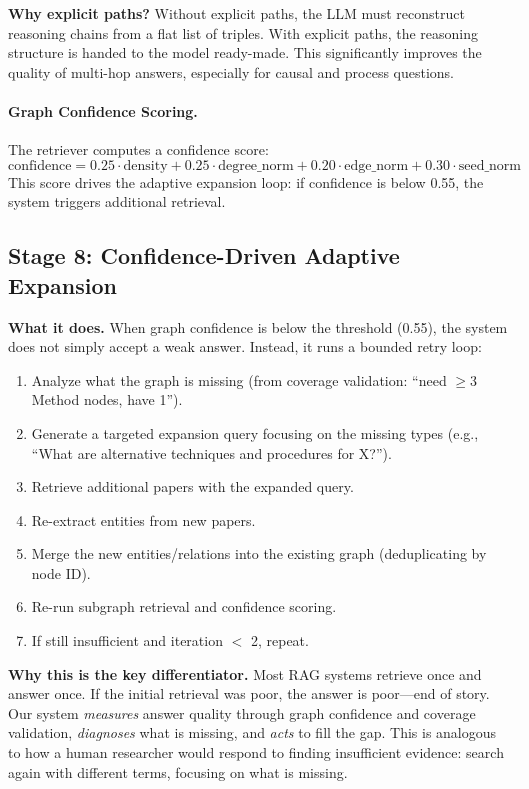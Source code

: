 \documentclass[11pt]{article}
\begin{document}
\textbf{Why explicit paths?} Without explicit paths, the LLM must reconstruct reasoning chains from a flat list of triples. With explicit paths, the reasoning structure is handed to the model ready-made. This significantly improves the quality of multi-hop answers, especially for causal and process questions.

\paragraph{Graph Confidence Scoring.} The retriever computes a confidence score:
\[
\text{confidence} = 0.25 \cdot \text{density} + 0.25 \cdot \text{degree\_norm} + 0.20 \cdot \text{edge\_norm} + 0.30 \cdot \text{seed\_norm}
\]
This score drives the adaptive expansion loop: if confidence is below 0.55, the system triggers additional retrieval.

\subsection{Stage 8: Confidence-Driven Adaptive Expansion}

\textbf{What it does.} When graph confidence is below the threshold (0.55), the system does not simply accept a weak answer. Instead, it runs a bounded retry loop:

\begin{enumerate}[leftmargin=1.2em]
  \item Analyze what the graph is missing (from coverage validation: ``need $\geq$3 Method nodes, have 1'').
  \item Generate a targeted expansion query focusing on the missing types (e.g., ``What are alternative techniques and procedures for X?'').
  \item Retrieve additional papers with the expanded query.
  \item Re-extract entities from new papers.
  \item Merge the new entities/relations into the existing graph (deduplicating by node ID).
  \item Re-run subgraph retrieval and confidence scoring.
  \item If still insufficient and iteration $<$ 2, repeat.
\end{enumerate}

\textbf{Why this is the key differentiator.} Most RAG systems retrieve once and answer once. If the initial retrieval was poor, the answer is poor---end of story. Our system \emph{measures} answer quality through graph confidence and coverage validation, \emph{diagnoses} what is missing, and \emph{acts} to fill the gap. This is analogous to how a human researcher would respond to finding insufficient evidence: search again with different terms, focusing on what is missing.
\end{document}
